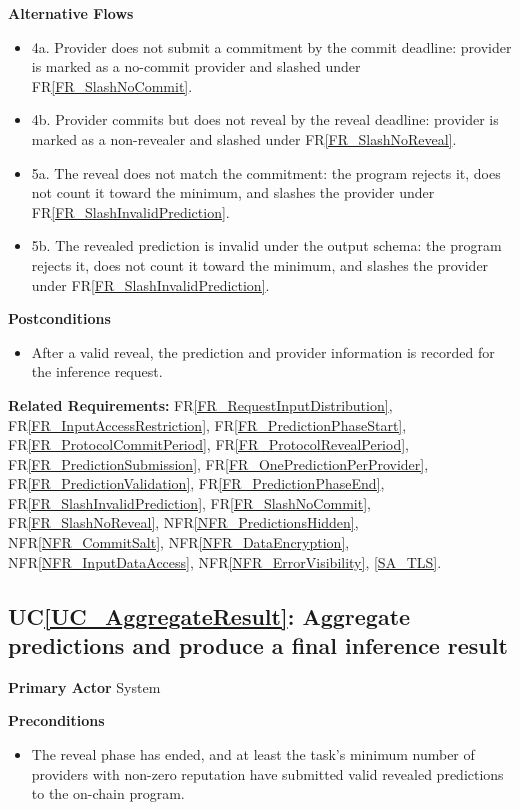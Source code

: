 \documentclass[12pt]{article}
\newcounter{ucnum} %
\newcommand{\ucref}[1]{UC\ref{#1}}
\newcommand{\rref}[1]{FR\ref{#1}}
\newcommand{\nfrref}[1]{NFR\ref{#1}}
\begin{document}
\textbf{Alternative Flows}
\begin{itemize}
\item 4a. Provider does not submit a commitment by the commit deadline: provider is marked as a no-commit provider and slashed under \rref{FR_SlashNoCommit}.
\item 4b. Provider commits but does not reveal by the reveal deadline: provider is marked as a non-revealer and slashed under \rref{FR_SlashNoReveal}.
\item 5a. The reveal does not match the commitment: the program rejects it, does not count it toward the minimum, and slashes the provider under \rref{FR_SlashInvalidPrediction}.
\item 5b. The revealed prediction is invalid under the output schema: the program rejects it, does not count it toward the minimum, and slashes the provider under \rref{FR_SlashInvalidPrediction}.
\end{itemize}

\textbf{Postconditions}
\begin{itemize}
\item After a valid reveal, the prediction and provider information is recorded for the inference request.
\end{itemize}

\textbf{Related Requirements:} \rref{FR_RequestInputDistribution}, \rref{FR_InputAccessRestriction}, \rref{FR_PredictionPhaseStart}, \rref{FR_ProtocolCommitPeriod}, \rref{FR_ProtocolRevealPeriod}, \rref{FR_PredictionSubmission}, \rref{FR_OnePredictionPerProvider}, \rref{FR_PredictionValidation}, \rref{FR_PredictionPhaseEnd}, \rref{FR_SlashInvalidPrediction}, \rref{FR_SlashNoCommit}, \rref{FR_SlashNoReveal}, \nfrref{NFR_PredictionsHidden}, \nfrref{NFR_CommitSalt}, \nfrref{NFR_DataEncryption}, \nfrref{NFR_InputDataAccess}, \nfrref{NFR_ErrorVisibility}, \ref{SA_TLS}.

 \label{UC_AggregateResult}
\subsection{\ucref{UC_AggregateResult}: Aggregate predictions and produce a final inference result}

\textbf{Primary Actor}
System

\textbf{Preconditions}
\begin{itemize}
\item The reveal phase has ended, and at least the task's minimum number of providers with non-zero reputation have submitted valid revealed predictions to the on-chain program.
\end{itemize}
\end{document}
